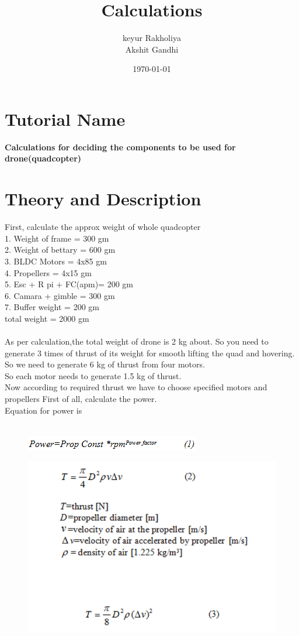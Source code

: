 \documentclass[11pt,a4paper]{article}
\title{Calculations}
\author{keyur Rakholiya \\ Akshit Gandhi}
\date{\today}
\begin{document}
	\maketitle
	\newpage
	\tableofcontents
	\newpage
	\section{Tutorial Name}
		\textbf{Calculations for deciding the components to
		be used for drone(quadcopter)}

	\section{Theory and Description}
		First, calculate the approx weight of whole quadcopter\\
		1. Weight of frame = 300 gm\\
		2. Weight of bettary = 600 gm\\
		3. BLDC Motors = 4x85 gm\\
		4. Propellers = 4x15 gm\\
		5. Esc + R pi + FC(apm)= 200 gm\\
		6. Camara + gimble = 300 gm\\
		7. Buffer weight = 200 gm\\
		total weight = 2000 gm\\
		\\
		As per calculation,the total weight of drone is 2 kg about.
		So you need to generate 3 times of thrust of its weight for smooth lifting the quad and
		hovering.\\
		So we need to generate 6 kg of thrust from four motors.\\
		So each motor needs to generate 1.5 kg of thrust.\\
		Now according to required thrust we have to choose specified motors and propellers
		First of all, calculate the power.\\
		Equation for power is\\
		\\
		\begin{figure}[H]
			\centering
			\includegraphics[width = 400 px]{equation1}
		\end{figure}
		
			\begin{figure}[H]
				\centering
				\includegraphics[width = 400 px]{eq2}
			\end{figure}
			
\end{document}
